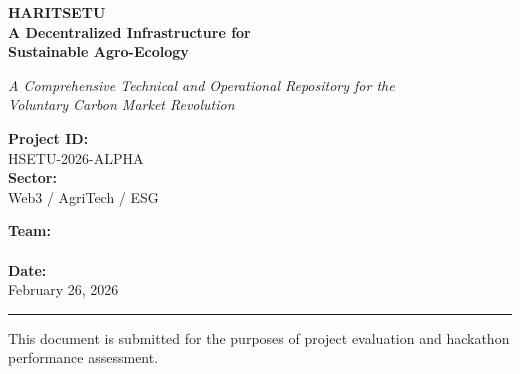 \documentclass[11pt,a4paper]{article}
\begin{document}
\begin{titlepage}
    \centering
    \vspace*{2cm}
    
    \Huge \textbf{\color{HaritGreen}HARITSETU} \\
    \vspace{0.5cm}
    \LARGE \textbf{A Decentralized Infrastructure for \\ Sustainable Agro-Ecology} \\
    
    \vspace{1.5cm}
    \vspace{3cm}
    
    \large \textit{A Comprehensive Technical and Operational Repository for the \\ 
    Voluntary Carbon Market Revolution} \\
    
    \vspace{2cm}
    
    \begin{minipage}{0.4\textwidth}
        \begin{flushleft} \large
            \textbf{\color{EcoBlue}Project ID:} \\
            HSETU-2026-ALPHA \\
            \vspace{0.3cm}
            \textbf{\color{EcoBlue}Sector:} \\
            Web3 / AgriTech / ESG
        \end{flushleft}
    \end{minipage}
    \begin{minipage}{0.4\textwidth}
        \begin{flushright} \large
            \textbf{\color{EcoBlue}Team:} \\
            [Team HaritSetu] \\
            \vspace{0.3cm}
            \textbf{\color{EcoBlue}Date:} \\
            February 26, 2026
        \end{flushright}
    \end{minipage}
    
    \vfill
    \noindent\rule{\textwidth}{1pt}
    \vspace{0.5cm}
    \color{gray} \small This document is submitted for the purposes of project evaluation and hackathon performance assessment.
\end{titlepage}
\end{document}
